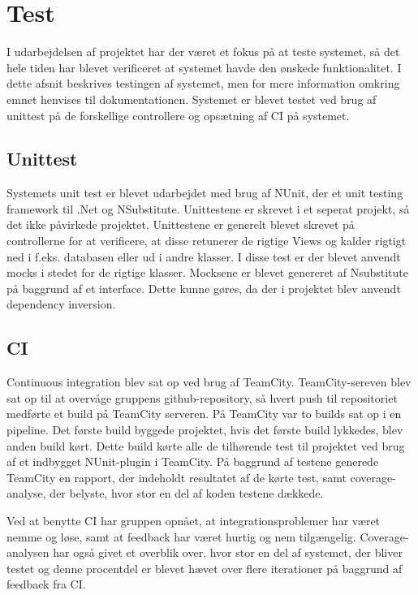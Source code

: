 \chapter{Test}
I udarbejdelsen af projektet har der været et fokus på at teste systemet, så det hele tiden har blevet verificeret at systemet havde den ønskede funktionalitet. I dette afsnit beskrives testingen af systemet, men for mere information omkring emnet henvises til dokumentationen.
Systemet er blevet testet ved brug af unittest på de forskellige controllere og opsætning af CI på systemet.

\section{Unittest}
Systemets unit test er blevet udarbejdet med brug af NUnit, der et unit testing framework til .Net og NSubstitute. Unittestene er skrevet i et seperat projekt, så det ikke påvirkede projektet.
Unittestene er generelt blevet skrevet på controllerne for at verificere, at disse retunerer de rigtige Views og kalder rigtigt ned i f.eks. databasen eller ud i andre klasser. I disse test er der blevet anvendt mocks i stedet for de rigtige klasser. Mocksene er blevet genereret af Nsubstitute på baggrund af et interface. Dette kunne gøres, da der i  projektet blev anvendt dependency inversion.


\section{CI}
Continuous integration blev sat op ved brug af TeamCity. TeamCity-sereven blev sat op til at overvåge gruppens github-repository, så hvert push til repositoriet medførte et build på TeamCity serveren. På TeamCity var to builds sat op i en pipeline. Det første build byggede projektet, hvis det første build lykkedes, blev anden build kørt. Dette build kørte alle de tilhørende test til projektet ved brug af et indbygget NUnit-plugin i TeamCity. På baggrund af testene generede TeamCity en rapport, der indeholdt resultatet af de kørte test, samt coverage-analyse, der belyste, hvor stor en del af koden testene dækkede.

\noindent Ved at benytte CI har gruppen opnået, at integrationsproblemer har været nemme og løse, samt at feedback har været hurtig og nem tilgængelig. Coverage-analysen har også givet et overblik over, hvor stor en del af systemet, der bliver testet og denne procentdel er blevet hævet over flere iterationer på baggrund af feedback fra CI.